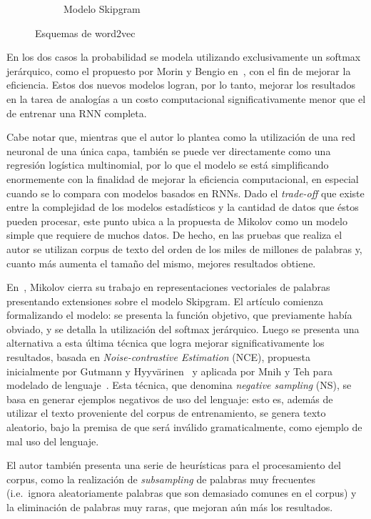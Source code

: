 \begin{figure}[h]
\begin{subfigure}[b]{0.45\textwidth}
    \caption{Modelo Skipgram}
    \label{fig:sg}
  \end{subfigure}

  \caption{Esquemas de word2vec}
\end{figure}

En los dos casos la probabilidad se modela utilizando exclusivamente un softmax jerárquico, como el
propuesto por Morin y Bengio en~\cite{MorinBengio2005}, con el fin de mejorar la eficiencia. Estos
dos nuevos modelos logran, por lo tanto, mejorar los resultados en la tarea de analogías a un costo
computacional significativamente menor que el de entrenar una RNN completa.

Cabe notar que, mientras que el autor lo plantea como la utilización de una red neuronal de una
única capa, también se puede ver directamente como una regresión logística multinomial, por lo que
el modelo se está simplificando enormemente con la finalidad de mejorar la eficiencia computacional,
en especial cuando se lo compara con modelos basados en RNNs. Dado el \textit{trade-off} que existe
entre la complejidad de los modelos estadísticos y la cantidad de datos que éstos pueden procesar,
este punto ubica a la propuesta de Mikolov como un modelo simple que requiere de muchos datos. De
hecho, en las pruebas que realiza el autor se utilizan corpus de texto del orden de los miles de
millones de palabras y, cuanto más aumenta el tamaño del mismo, mejores resultados obtiene.

En~\cite{Mikolov2013c}, Mikolov cierra su trabajo en representaciones vectoriales de palabras
presentando extensiones sobre el modelo Skipgram. El artículo comienza formalizando el modelo: se
presenta la función objetivo, que previamente había obviado, y se detalla la utilización del softmax
jerárquico. Luego se presenta una alternativa a esta última técnica que logra mejorar
significativamente los resultados, basada en \textit{Noise-contrastive Estimation} (NCE), propuesta
inicialmente por Gutmann y Hyyvärinen~\cite{Gutmann2012} y aplicada por Mnih y Teh para modelado de
lenguaje~\cite{MnihTeh2012}. Esta técnica, que denomina \textit{negative sampling} (NS), se basa en
generar ejemplos negativos de uso del lenguaje: esto es, además de utilizar el texto proveniente del
corpus de entrenamiento, se genera texto aleatorio, bajo la premisa de que será inválido
gramaticalmente, como ejemplo de mal uso del lenguaje.

El autor también presenta una serie de heurísticas para el procesamiento del corpus, como la
realización de \textit{subsampling} de palabras muy frecuentes (i.e.\ ignora aleatoriamente palabras que
son demasiado comunes en el corpus) y la eliminación de palabras muy raras, que mejoran aún más los
resultados.

